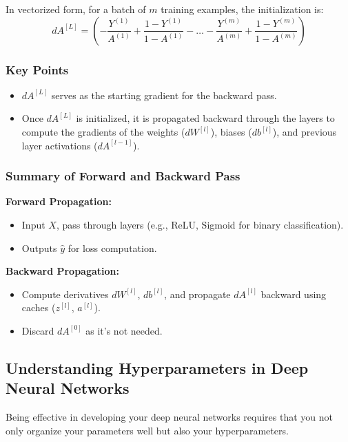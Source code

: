 \documentclass[letterpaper,12pt,notitlepage,twoside]{report}
\begin{document}
In vectorized form, for a batch of \( m \) training examples, the initialization is:
\[
dA^{[L]} = \left(- \frac{Y^{(1)}}{A^{(1)}} + \frac{1 - Y^{(1)}}{1 - A^{(1)}} - \dots - \frac{Y^{(m)}}{A^{(m)}} + \frac{1 - Y^{(m)}}{1 - A^{(m)}} \right)
\]

\subsubsection*{Key Points}
\begin{itemize}[nosep]
    \item \( dA^{[L]} \) serves as the starting gradient for the backward pass.
    \item Once \( dA^{[L]} \) is initialized, it is propagated backward through the layers to compute the gradients of the weights (\( dW^{[l]} \)), biases (\( db^{[l]} \)), and previous layer activations (\( dA^{[l-1]} \)).
\end{itemize}

\subsubsection*{Summary of Forward and Backward Pass}
\textbf{Forward Propagation:}
\begin{itemize}[nosep]
\item Input \(X\), pass through layers (e.g., ReLU, Sigmoid for binary classification).
\item Outputs \(\hat{y}\) for loss computation.
\end{itemize}

\textbf{Backward Propagation:}
\begin{itemize}[nosep]
 \item Compute derivatives \(dW^{[l]}\), \(db^{[l]}\), and propagate \(dA^{[l]}\) backward using caches (\(z^{[l]}\), \(a^{[l]}\)).
 \item Discard \(dA^{[0]}\) as it’s not needed.
\end{itemize}

\subsection{Understanding Hyperparameters in Deep Neural Networks}

Being effective in developing your deep neural networks requires that you not only organize your parameters well but also your hyperparameters. 
\end{document}
